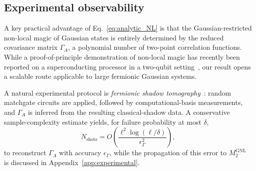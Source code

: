 \documentclass[prx,twocolumn,superscriptaddress,aps,10pt, frontmatterverbose, reprint,footinbib,longbibliography=true]{revtex4-2}
\begin{document}
\subsection{Experimental observability}
A key practical advantage of Eq.~\eqref{eq:analytic_NL} is that the Gaussian-restricted non-local magic of Gaussian states is entirely determined by the reduced covariance matrix $\Gamma_A$, a polynomial number of two-point correlation functions.
While a proof-of-principle demonstration of non-local magic has recently been reported on a superconducting processor in a two-qubit setting~\cite{ahmad2025experimentaldemonstrationnonlocalmagic}, our result opens a scalable route applicable to large fermionic Gaussian systems.

A natural experimental protocol is \emph{fermionic shadow tomography}~\cite{Wan_2023}: random matchgate circuits are applied, followed by computational-basis measurements, and $\Gamma_A$ is inferred from the resulting classical-shadow data.
A conservative sample-complexity estimate yields, for failure probability at most $\delta$,
\[
N_{\mathrm{shots}} = O\!\left(\frac{\ell^2 \log(\ell/\delta)}{\epsilon_\Gamma^2}\right),
\]
to reconstruct \(\Gamma_A\) with accuracy \(\epsilon_\Gamma\), while the propagation of this error  to \(M_2^{\mathrm{GNL}}\) is discussed in  Appendix~\ref{app:experimental}.
\end{document}
